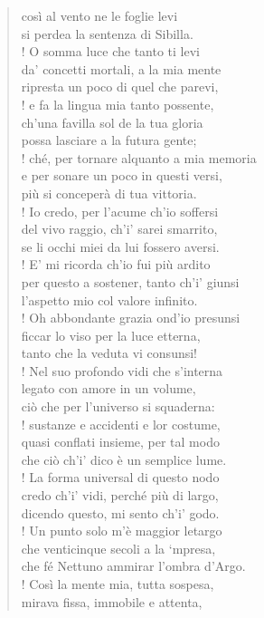 \documentclass[a4paper, twoside, titlepage]{book}
\newcounter{mar}
\begin{document}
\begin{verse}
così al vento ne le foglie levi\\
si perdea la sentenza di Sibilla.\\!
O somma luce che tanto ti levi\\
da’ concetti mortali, a la mia mente\\
ripresta un poco di quel che parevi,\\!
e fa la lingua mia tanto possente,\\
ch’una favilla sol de la tua gloria\\
possa lasciare a la futura gente;\\!
ché, per tornare alquanto a mia memoria\\
e per sonare un poco in questi versi,\\
più si conceperà di tua vittoria.\\!
Io credo, per l’acume ch’io soffersi\\
del vivo raggio, ch’i’ sarei smarrito,\\
se li occhi miei da lui fossero aversi.\\!
E’ mi ricorda ch’io fui più ardito\\
per questo a sostener, tanto ch’i’ giunsi\\
l’aspetto mio col valore infinito.\\!
Oh abbondante grazia ond’io presunsi\\
ficcar lo viso per la luce etterna,\\
tanto che la veduta vi consunsi!\\!
Nel suo profondo vidi che s’interna\\
legato con amore in un volume,\\
ciò che per l’universo si squaderna:\\!
sustanze e accidenti e lor costume,\\
quasi conflati insieme, per tal modo\\
che ciò ch’i’ dico è un semplice lume.\\!
La forma universal di questo nodo\\
credo ch’i’ vidi, perché più di largo,\\
dicendo questo, mi sento ch’i’ godo.\\!
Un punto solo m’è maggior letargo\\
che venticinque secoli a la ‘mpresa,\\
che fé Nettuno ammirar l’ombra d’Argo.\\!
Così la mente mia, tutta sospesa,\\
mirava fissa, immobile e attenta,\\

\end{verse}
\end{document}

